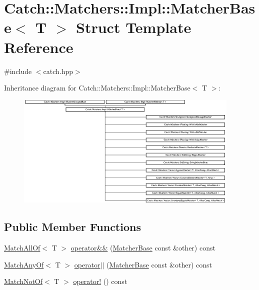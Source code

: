 \hypertarget{struct_catch_1_1_matchers_1_1_impl_1_1_matcher_base}{}\section{Catch\+:\+:Matchers\+:\+:Impl\+:\+:Matcher\+Base$<$ T $>$ Struct Template Reference}
\label{struct_catch_1_1_matchers_1_1_impl_1_1_matcher_base}


{\ttfamily \#include $<$catch.\+hpp$>$}

Inheritance diagram for Catch\+:\+:Matchers\+:\+:Impl\+:\+:Matcher\+Base$<$ T $>$\+:\begin{figure}[H]
\begin{center}
\leavevmode
\includegraphics[height=5.444445cm]{struct_catch_1_1_matchers_1_1_impl_1_1_matcher_base}
\end{center}
\end{figure}
\subsection*{Public Member Functions}
\begin{DoxyCompactItemize}
\item 
\mbox{\hyperlink{struct_catch_1_1_matchers_1_1_impl_1_1_match_all_of}{Match\+All\+Of}}$<$ T $>$ \mbox{\hyperlink{struct_catch_1_1_matchers_1_1_impl_1_1_matcher_base_a23c336f6d9457735ddc8dc7ea864d7c9}{operator\&\&}} (\mbox{\hyperlink{struct_catch_1_1_matchers_1_1_impl_1_1_matcher_base}{Matcher\+Base}} const \&other) const
\item 
\mbox{\hyperlink{struct_catch_1_1_matchers_1_1_impl_1_1_match_any_of}{Match\+Any\+Of}}$<$ T $>$ \mbox{\hyperlink{struct_catch_1_1_matchers_1_1_impl_1_1_matcher_base_a5f8542b8f1567a6f9c65d0a6da7b679b}{operator$\vert$$\vert$}} (\mbox{\hyperlink{struct_catch_1_1_matchers_1_1_impl_1_1_matcher_base}{Matcher\+Base}} const \&other) const
\item 
\mbox{\hyperlink{struct_catch_1_1_matchers_1_1_impl_1_1_match_not_of}{Match\+Not\+Of}}$<$ T $>$ \mbox{\hyperlink{struct_catch_1_1_matchers_1_1_impl_1_1_matcher_base_a5bb94bf2ff5c7ef73b7c11eb173bdf3b}{operator!}} () const
\end{DoxyCompactItemize}
